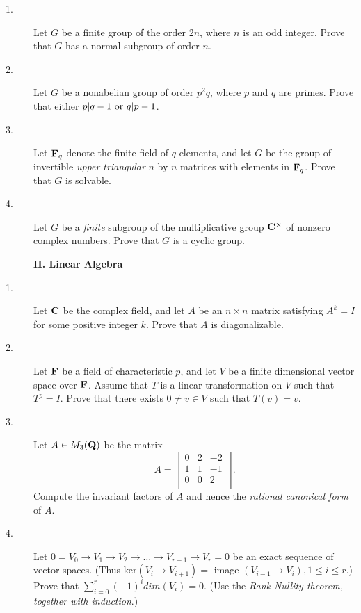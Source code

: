 \documentclass{article}
\begin{document}
\begin{description}
\item[1.]
Let $G$ be a finite group of the order $2n$, where $n$ is an odd integer.
Prove that $G$ has a normal subgroup of order $n$.

\item[2.]
Let $G$ be a nonabelian group of order $p^2q$, where $p$ and $q$ are primes.
Prove that either $p|q-1 \hbox{\ or\ } q|p-1$.

\item[3.]
Let ${\bf F}_q$ denote the finite field of $q$ elements, and let $G$ be the group
of invertible {\it upper triangular} $n$ by $n$ matrices with elements in
${\bf F}_q$. Prove that $G$ is solvable.

\item[4.]
Let $G$ be a {\it finite} subgroup of the multiplicative group
${\bf C}^\times$ of
nonzero complex numbers. Prove that $G$ is a cyclic group.

\centerline{{\bf II. Linear Algebra}}

\item[1.]
Let ${\bf C}$ be the complex field, and let $A$ be an $n \times n$ matrix satisfying
$A^k = I$ for some positive integer $k$. Prove that $A$ is diagonalizable.

\item[2.]
Let ${\bf F}$ be a field of characteristic $p$, and let $V$ be a finite dimensional
vector space over ${\bf F}$. Assume that $T$ is a linear transformation on $V$
such that $T^p = I$. Prove that there exists $0 \neq v \in V$ such that
$T(v) = v$.

\item[3.]
Let $A \in M_3({\bf Q})$ be the matrix
$$A = \left[ \begin{matrix}
        0 & 2& -2 \\
        1 & 1& -1 \\
        0 & 0& 2 \\
        \end{matrix} \right].$$
Compute the invariant factors of $A$ and hence the {\it rational canonical
form} of $A$.

\item[4.]
Let $0 = V_0 \to V_1 \to V_2 \to \dots \to V_{r-1} \to V_r = 0$
be an exact sequence of vector spaces. (Thus ker$(V_i \to V_{i+1})=$ image
$(V_{i-1} \to V_i), 1 \leq i \leq r$.) Prove that
$\sum^r_{i=0} (-1)^i dim (V_i) =0$. (Use the {\it Rank-Nullity theorem,
together with induction}.)


\end{description}
\end{document}
